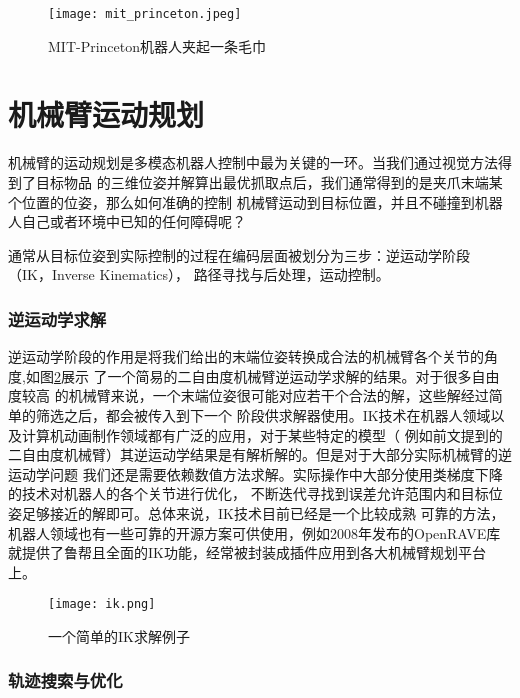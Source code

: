 \begin{figure}[h] %
  \centering
  \texttt{[image: mit\_princeton.jpeg]}
  \caption{MIT-Princeton机器人夹起一条毛巾}
  \label{fig:mit_princeton}
\end{figure}

\section{机械臂运动规划}

机械臂的运动规划是多模态机器人控制中最为关键的一环。当我们通过视觉方法得到了目标物品
的三维位姿并解算出最优抓取点后，我们通常得到的是夹爪末端某个位置的位姿，那么如何准确的控制
机械臂运动到目标位置，并且不碰撞到机器人自己或者环境中已知的任何障碍呢？

通常从目标位姿到实际控制的过程在编码层面被划分为三步：逆运动学阶段（IK，Inverse Kinematics），
路径寻找与后处理，运动控制。

\subsubsection{逆运动学求解}

逆运动学阶段的作用是将我们给出的末端位姿转换成合法的机械臂各个关节的角度,如图\ref{fig:ik}展示
了一个简易的二自由度机械臂逆运动学求解的结果。对于很多自由度较高
的机械臂来说，一个末端位姿很可能对应若干个合法的解，这些解经过简单的筛选之后，都会被传入到下一个
阶段供求解器使用。IK技术在机器人领域以及计算机动画制作领域都有广泛的应用，对于某些特定的模型（
例如前文提到的二自由度机械臂）其逆运动学结果是有解析解的。但是对于大部分实际机械臂的逆运动学问题
我们还是需要依赖数值方法求解。实际操作中大部分使用类梯度下降的技术对机器人的各个关节进行优化，
不断迭代寻找到误差允许范围内和目标位姿足够接近的解即可。总体来说，IK技术目前已经是一个比较成熟
可靠的方法，机器人领域也有一些可靠的开源方案可供使用，例如2008年发布的OpenRAVE库\cite{diankov2008openrave}
就提供了鲁帮且全面的IK功能，经常被封装成插件应用到各大机械臂规划平台上。

\begin{figure}[h] %
  \centering
  \texttt{[image: ik.png]}
  \caption{一个简单的IK求解例子}
  \label{fig:ik}
\end{figure}

\subsubsection{轨迹搜索与优化}

